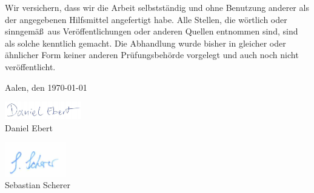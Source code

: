 \documentclass[12pt]{report}
\begin{document}
Wir versichern, dass wir die Arbeit selbstst\"andig und ohne Benutzung
anderer als der angegebenen Hilfsmittel angefertigt habe. Alle Stellen, die
w\"ortlich oder sinngem\"a\ss\ aus Ver\"offentlichungen oder anderen Quellen
entnommen sind, sind als solche kenntlich gemacht. Die Abhandlung wurde
bisher in gleicher oder \"ahnlicher Form keiner anderen Pr\"ufungsbeh\"orde
vorgelegt und auch noch nicht ver\"offentlicht.

\vspace*{2ex}%
Aalen, den \today

\vspace*{2ex}
\includegraphics[width=0.25\textwidth]{Images/EbertScherer/ebertunterschrift.PNG}
\\Daniel Ebert

\vspace*{2ex}
\includegraphics[width=0.2\textwidth]{Images/EbertScherer/unterschrift.png}
\\Sebastian Scherer
\end{document}
